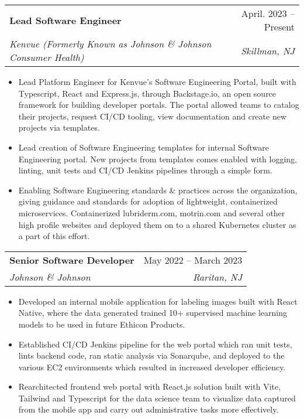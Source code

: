 \documentclass[letterpaper,11pt]{article}
\makeatletter
\newcommand{\resumeItem}[1]{
  \item\small{
    {#1 \vspace{-2pt}}
  }
}
\newcommand{\resumeSubheading}[4]{
  \vspace{-2pt}\item
    \begin{tabular*}{0.95\textwidth}[t]{l@{\extracolsep{\fill}}r}
      \textbf{#1} & #2 \\
      \textit{\small#3} & \textit{\small #4} \\
    \end{tabular*}\vspace{-7pt}
}
\newcommand{\resumeItemListStart}{\begin{itemize}}
\newcommand{\resumeItemListEnd}{\end{itemize}\vspace{-5pt}}
\makeatother
\begin{document}
    \resumeSubheading
      {Lead Software Engineer}{April. 2023 -- Present}
      {Kenvue (Formerly Known as Johnson \& Johnson Consumer Health)}{Skillman, NJ}
      \resumeItemListStart
        \resumeItem{Lead Platform Engineer for Kenvue's Software Engineering Portal, built with Typescript, React and Express.js, through Backstage.io, an open source framework for building developer portals. The portal allowed teams to catalog their projects, request CI/CD tooling, view documentation and create new projects via templates. }
        \resumeItem{Lead creation of Software Engineering templates for internal Software Engineering portal. New projects from templates comes enabled with logging, linting, unit tests and CI/CD Jenkins pipelines through a simple form.}
        \resumeItem{Enabling Software Engineering standards \& practices across the organization, giving guidance and standards for adoption of lightweight, containerized microservices. Containerized lubriderm.com, motrin.com and several other high profile websites and deployed them on to a shared Kubernetes cluster as a part of this effort. }
    \resumeItemListEnd

    \resumeSubheading
      {Senior Software Developer}{May 2022 -- March 2023}
      {Johnson \& Johnson}{Raritan, NJ}
      \resumeItemListStart
        \resumeItem{Developed an internal mobile application for labeling images built with React Native, where the data generated trained 10+ supervised machine learning models to be used in future Ethicon Products.}
        \resumeItem{Established CI/CD Jenkins pipeline for the web portal which ran unit tests, lints backend code, ran static analysis via
Sonarqube, and deployed to the various EC2 environments which resulted in increased developer efficiency.}
        \resumeItem{Rearchitected frontend web portal with React.js solution built with Vite, Tailwind and Typescript for the data science
team to visualize data captured from the mobile app and carry out administrative tasks more effectively.}
      \resumeItemListEnd
\end{document}
